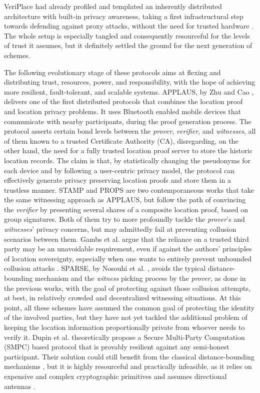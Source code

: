 VeriPlace had already profiled and templated an inherently distributed architecture with built-in privacy awareness, taking a first infrastructural step towards defending against proxy attacks, without the need for trusted hardware \cite{luo2010veriplace}. The whole setup is especially tangled and consequently resourceful for the levels of trust it assumes, but it definitely settled the ground for the next generation of \pol{} schemes. 

The following evolutionary stage of these protocols aims at flexing and distributing trust, resources, power, and responsibility, with the hope of achieving more resilient, fault-tolerant, and scalable systems. APPLAUS, by Zhu and Cao \cite{zhu2011applaus}, delivers one of the first distributed protocols that combines the location proof and location privacy problems. It uses Bluetooth enabled mobile devices that communicate with nearby participants, during the proof generation process. The protocol asserts certain bond levels between the \emph{prover}, \emph{verifier}, and \emph{witnesses}, all of them known to a trusted Certificate Authority (CA), disregarding, on the other hand, the need for a fully trusted location proof server to store the historic location records. The claim is that, by statistically changing the pseudonyms for each device and by following a user-centric privacy model, the protocol can effectively generate privacy preserving location proofs and store them in a trustless manner. STAMP \cite{wang2016stamp} and PROPS \cite{gambs2014props} are two contemporaneous works that take the same witnessing approach as APPLAUS, but follow the path of convincing the \emph{verifier} by presenting several shares of a composite location proof, based on group signatures. Both of them try to more profoundly tackle the \emph{prover}'s and \emph{witnesses}' privacy concerns, but may admittedly fail at preventing collusion scenarios between them. Gambs et al. argue that the reliance on a trusted third party may be an unavoidable requirement, even if against the authors' principles of location sovereignty, especially when one wants to entirely prevent unbounded collusion attacks \cite{gambs2014props}. SPARSE, by Nosouhi et al. \cite{nosouhi2018sparse}, avoids the typical distance-bounding mechanism and the \emph{witness} picking process by the \emph{prover}, as done in the previous works, with the goal of protecting against those collusion attempts, at best, in relatively crowded and decentralized witnessing situations. At this point, all these schemes have assumed the common goal of protecting the identity of the involved parties, but they have not yet tackled the additional problem of keeping the location information proportionally private from whoever needs to verify it. Dupin et al. \cite{dupin2018location} theoretically propose a Secure Multi-Party Computation (SMPC) based protocol that is provably resilient against any semi-honest participant. Their solution could still benefit from the classical distance-bounding mechanisms \cite{dupin2018location}, but it is highly resourceful and practically infeasible, as it relies on expensive and complex cryptographic primitives and assumes directional antennas \cite{yang2021group}.


